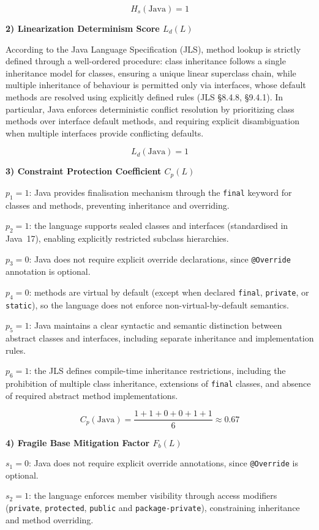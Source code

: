 \[
    H_s(\text{Java}) = 1
\]

\textbf{2) Linearization Determinism Score $L_d(L)$}

According to the Java Language Specification (JLS), method lookup is strictly defined through a well-ordered procedure: class inheritance follows a single inheritance model for classes, ensuring a unique linear superclass chain, while multiple inheritance of behaviour is permitted only via interfaces, whose default methods are resolved using explicitly defined rules (JLS \S8.4.8, \S9.4.1). In particular, Java enforces deterministic conflict resolution by prioritizing class methods over interface default methods, and requiring explicit disambiguation when multiple interfaces provide conflicting defaults.

\[
    L_d(\text{Java}) = 1
\]

\textbf{3) Constraint Protection Coefficient $C_p(L)$}

$p_1=1$: Java provides finalisation mechanism through the \texttt{final} keyword for classes and methods, preventing inheritance and overriding.

$p_2=1$: the language supports sealed classes and interfaces (standardised in Java~17), enabling explicitly restricted subclass hierarchies.

$p_3=0$: Java does not require explicit override declarations, since \texttt{@Override} annotation is optional.

$p_4=0$: methods are virtual by default (except when declared \texttt{final}, \texttt{private}, or \texttt{static}), so the language does not enforce non-virtual-by-default semantics.

$p_5=1$: Java maintains a clear syntactic and semantic distinction between abstract classes and interfaces, including separate inheritance and implementation rules.

$p_6=1$: the JLS defines compile-time inheritance restrictions, including the prohibition of multiple class inheritance, extensions of \texttt{final} classes, and absence of required abstract method implementations.

\[
    C_p(\text{Java}) = \frac{1+1+0+0+1+1}{6} \approx 0.67
\]

\textbf{4) Fragile Base Mitigation Factor $F_b(L)$}

$s_1=0$: Java does not require explicit override annotations, since \texttt{@Override} is optional.

$s_2=1$: the language enforces member visibility through access modifiers (\texttt{private}, \texttt{protected}, \texttt{public} and \texttt{package-private}), constraining inheritance and method overriding.

